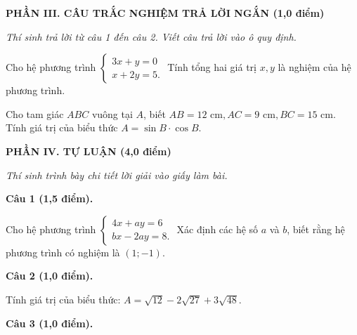 \documentclass[12pt,a4paper]{article}
\begin{document}
\noindent\textbf{\large PHẦN III. CÂU TRẮC NGHIỆM TRẢ LỜI NGẮN (1,0 điểm)}

\textit{Thí sinh trả lời từ câu 1 đến câu 2. Viết câu trả lời vào ô quy định.}

\vspace{1mm}
\begin{ex}
Cho hệ phương trình $\begin{cases} 3x + y = 0 \\ x + 2y = 5. \end{cases}$ Tính tổng hai giá trị $x, y$ là nghiệm của hệ phương trình.
\end{ex}

\begin{ex}
Cho tam giác $ABC$ vuông tại $A$, biết $AB = 12\text{ cm}, AC = 9\text{ cm}, BC = 15\text{ cm}$. Tính giá trị của biểu thức $A = \sin B \cdot \cos B$.
\end{ex}


\vspace{2mm}
\noindent\textbf{\large PHẦN IV. TỰ LUẬN (4,0 điểm)}

\textit{Thí sinh trình bày chi tiết lời giải vào giấy làm bài.}

\vspace{1mm}
\noindent\textbf{Câu 1 (1,5 điểm).}

Cho hệ phương trình $\begin{cases} 4x + ay = 6 \\ bx - 2ay = 8. \end{cases}$ Xác định các hệ số $a$ và $b$, biết rằng hệ phương trình có nghiệm là $(1; -1)$.

\vspace{2mm}
\noindent\textbf{Câu 2 (1,0 điểm).}

Tính giá trị của biểu thức: $A = \sqrt{12} - 2\sqrt{27} + 3\sqrt{48}$.

\vspace{2mm}
\noindent\textbf{Câu 3 (1,0 điểm).}
\end{document}

